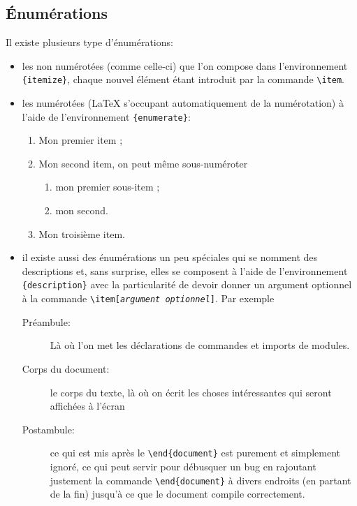 \documentclass[12pt,a4paper]{article}
\newcommand{\ofg}[1]{\og{}#1\fg{}}
\newcommand{\env}[1]{\texttt{\{#1\}}}
\newcommand{\cmd}[1]{\texttt{\textbackslash#1}}
\begin{document}
\subsection{Énumérations}

Il existe plusieurs type d'énumérations:
\begin{itemize}
	\item	les non numérotées (comme celle-ci) que l'on compose dans l'environnement \env{itemize}, chaque nouvel élément étant introduit par la commande \cmd{item}.
    
    \item	les numérotées (\LaTeX{} s'occupant automatiquement de la numérotation) à l'aide de l'environnement \env{enumerate}:
    	\begin{enumerate}
        	\item	Mon premier item ; 
            
            \item	Mon second item, on peut même sous-numéroter
            	\begin{enumerate}
                	\item	mon premier sous-item ;
                    
                    \item	mon second.
                \end{enumerate}
            
            \item	Mon troisième item.
            
        \end{enumerate}
    \item	il existe aussi des énumérations un peu spéciales qui se nomment des \ofg{descriptions} et, sans surprise, elles se composent à l'aide de l'environnement \env{description} avec la particularité de devoir donner un argument optionnel à la commande \cmd{item[\emph{argument optionnel}]}. Par exemple
    	\begin{description}
        	\item[Préambule:] Là où l'on met les déclarations de commandes et imports de modules.
            
            \item[Corps du document:] le corps du texte, là où on écrit les choses intéressantes qui seront affichées à l'écran
            
            \item[Postambule:] ce qui est mis après le \cmd{end\{document\}} est purement et simplement ignoré, ce qui peut servir pour débusquer un bug en rajoutant justement la commande \cmd{end\{document\}} à divers endroits (en partant de la fin) jusqu'à ce que le document compile correctement.
        \end{description}
    
\end{itemize}
\end{document}
